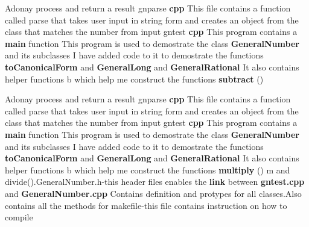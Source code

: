 \begin{DoxyCompactItemize}
\item 
Adonay process and return a result gnparse {\bf cpp} This file contains a function called parse that takes user input in string form and creates an object from the class that matches the number from input gntest {\bf cpp} This program contains a {\bf main} function This program is used to demostrate the class {\bf General\+Number} and its subclasses I have added code to it to demostrate the functions {\bf to\+Canonical\+Form} and {\bf General\+Long} and {\bf General\+Rational} It also contains helper functions b which help me construct the functions {\bf subtract} ()
\item 
Adonay process and return a result gnparse {\bf cpp} This file contains a function called parse that takes user input in string form and creates an object from the class that matches the number from input gntest {\bf cpp} This program contains a {\bf main} function This program is used to demostrate the class {\bf General\+Number} and its subclasses I have added code to it to demostrate the functions {\bf to\+Canonical\+Form} and {\bf General\+Long} and {\bf General\+Rational} It also contains helper functions b which help me construct the functions {\bf multiply} () m and divide().General\+Number.\+h-\/this header files enables the {\bf link} between {\bf gntest.\+cpp} and {\bf General\+Number.\+cpp} Contains definition and protypes for all classes.\+Also contains all the methods for makefile-\/this file contains instruction on how to compile
\end{DoxyCompactItemize}
